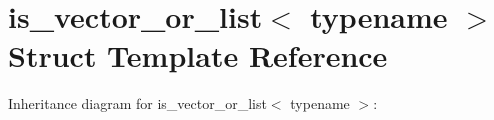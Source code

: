 \hypertarget{structis__vector__or__list}{}\section{is\+\_\+vector\+\_\+or\+\_\+list$<$ typename $>$ Struct Template Reference}
\label{structis__vector__or__list}


Inheritance diagram for is\+\_\+vector\+\_\+or\+\_\+list$<$ typename $>$\+:
